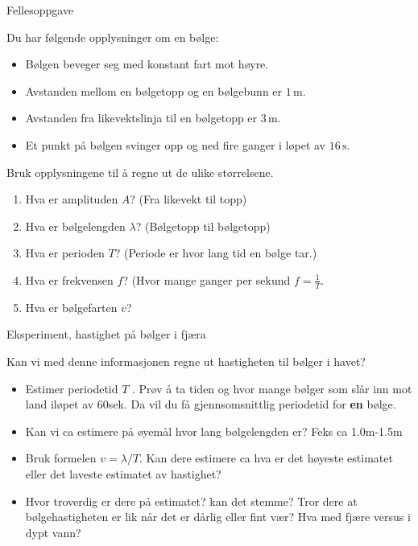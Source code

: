 \documentclass[aspectratio=119,12pt]{beamer}
\begin{document}
\begin{frame}{Fellesoppgave}

Du har følgende opplysninger om en bølge:

\begin{itemize}
    \item Bølgen beveger seg med konstant fart mot høyre.
    \item Avstanden mellom en bølgetopp og en bølgebunn er $1\,\mathrm{m}$.
    \item Avstanden fra likevektslinja til en bølgetopp er $3\,\mathrm{m}$.
    \item Et punkt på bølgen svinger opp og ned fire ganger i løpet av $16\,\mathrm{s}$.  
\end{itemize}

\noindent
Bruk opplysningene til å regne ut de ulike størrelsene. 

\begin{enumerate}
    \item Hva er amplituden $A$? (Fra likevekt til topp)
    \item Hva er bølgelengden $\lambda$? (Bølgetopp til bølgetopp)
    \item Hva er perioden $T$? (Periode er hvor lang tid en bølge tar.)
    \item Hva er frekvensen $f$? (Hvor mange ganger per sekund $ f=\frac{1}{T} $. 
    \item Hva er bølgefarten $v$?
\end{enumerate}

\end{frame}


\begin{frame}{Eksperiment, hastighet på bølger i fjæra}

    Kan vi med denne informasjonen regne ut hastigheten til bølger i havet?

    \begin{itemize}
        \item Estimer periodetid $T$ . Prøv å ta tiden og hvor mange bølger som slår inn mot land iløpet av 60sek. Da vil du få gjennsomsnittlig periodetid for \textbf{en} bølge.   
        \item Kan vi ca estimere på øyemål hvor lang bølgelengden er? Feks ca 1.0m-1.5m
        \item Bruk formelen $v = \lambda / T  $. Kan dere estimere ca hva er det høyeste estimatet eller det laveste estimatet av hastighet?  
        \item Hvor troverdig er dere på estimatet? kan det stemme? Tror dere at bølgehastigheten er lik når det er dårlig eller fint vær? Hva med fjære versus i dypt vann?   
    \end{itemize}

\end{frame}
\end{document}
